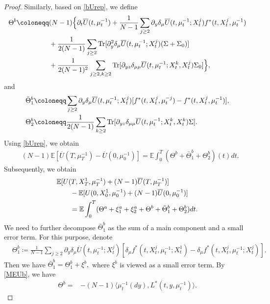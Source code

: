 \documentclass{amsart}
\theoremstyle{definition}
\theoremstyle{remark}
\def\EE{{\mathbb E}}
\numberwithin{equation}{section}
\begin{document}
\begin{proof}
 Similarly, based on  \eqref{bUrep}, we define
\begin{align*}
\Theta^b\coloneqq
  & (N-1)\Big\{ \partial_t \overline U(t, \mu_t^{-1})+ \frac{1}{N-1}\sum_{j\ge 2} \partial_{y}\delta_\mu \overline U(t, \mu_t^{-1}; X^j_t)f^*(t, X_t^j, \mu_t^{-1})  \\
& + \frac{1}{2(N-1)}\sum_{j\ge 2 }{\rm Tr}[ \partial_{y}^2\delta_\mu \overline U(t, \mu_t^{-1}; X^j_t)(\Sigma+\Sigma_0) ]\\
&+   \frac{1}{2(N-1)^2}\sum_{j\ge 2,k\ge 2  }{\rm Tr}[ \partial_{yz}
\delta_{\mu\mu}
\overline U(t, \mu_t^{-1};X_t^k, X^j_t)\Sigma_0 ]
\Big
\}, \notag
\end{align*}
and
\begin{align*}
& \bar \Theta^b_1 \coloneqq \sum_{j\ge 2} \partial_{y}\delta_\mu \overline U(t, \mu_t^{-1}; X^j_t)[f^*(t, X_t^j, \mu_t^{-j})- f^*(t, X_t^j, \mu_t^{-1})], \\
& \Theta_2^b \coloneqq  \frac{1}{2(N-1)} \sum_{k\ge 2 }{\rm Tr}[ \partial_{yz}\delta_{\mu\mu} \overline U(t, \mu_t^{-1}; X^k_t, X^k_t)\Sigma ].
\end{align*}
Using \eqref{bUrep},   we obtain
\begin{align*}
&(N-1)\EE [\overline U(T,  \mu_T^{-1})  - \overline U(0, \mu_0^{-1} )] = \EE \int_0^T(\Theta^b +\bar\Theta^b_1 + \Theta_2^b )(t) dt.
\end{align*}
Subsequently, we obtain
\begin{align}
&\EE [U(T, X_T^1, \mu_T^{-1})+(N-1) \overline U(T,  \mu_T^{-1})] \label{5UUb} \\
&\qquad   - \EE [U(0, X_0^1, \mu_0^{-1}) +(N-1) \overline U(0, \mu_0^{-1} ) ]\notag \\
&\qquad =\EE \int_0^T (\Theta^a+\xi_1^a+\xi_2^a+\Theta^b+ \bar \Theta^b_1+ \Theta^b_2) dt.\notag
\end{align}
We need to further decompose  $\bar \Theta^b_1$ as the sum  of a main component and a small error term.
For this purpose, denote
\begin{align*}
& \Theta^{b}_1 \coloneqq \frac{1}{N-1} \sum_{j\ge 2} \partial_{y}\delta_\mu \overline U(t, \mu_t^{-1}; X^j_t) [   \delta_\mu f^*(t, X_t^j, \mu_t^{-1}; X_t^1) - \delta_\mu f^*(t, X_t^j, \mu_t^{-1}; X_t^j) ].
 \end{align*}
Then we have
$\bar \Theta_1^b=\Theta_1^b+   \xi^b   ,$
where $\xi^b$ is viewed as a  small error term.
By \eqref{MEUb}, we have
 \begin{align*}
\Theta^{b}=&  -(N-1)\langle \mu_t^{-1}(dy), L^*(t, y, \mu_t^{-1}) \rangle.
\end{align*}


\end{proof}
\end{document}
